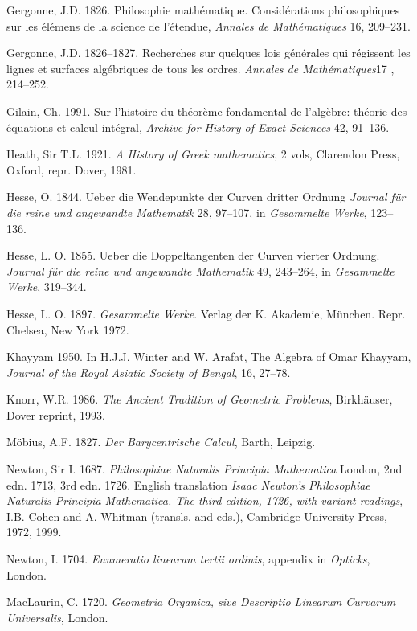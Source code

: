 \documentclass[11pt]{article}
\begin{document}
\noindent Gergonne, J.D. 1826. Philosophie math\'ematique. Consid\'erations philo\-sophiques sur les \'el\'emens de la science de l'\'etendue, \emph{Annales de Math\'ematiques} 16, 209--231.

\noindent Gergonne, J.D. 1826--1827. Recherches sur quelques lois g\'en\'erales qui r\'egissent les lignes et surfaces alg\'ebriques de tous les ordres. \emph{Annales de Math\'ematiques}17 , 214--252. 
 
 \noindent  Gilain, Ch. 1991. Sur l'histoire du th\'eor\`eme  fondamental de l'alg\`ebre: th\'eorie des \'equations et calcul int\'egral, \emph{Archive for History of Exact Sciences} 42, 91--136.
 
 \noindent Heath, Sir T.L. 1921. \emph{A History of Greek mathematics}, 2 vols, Clarendon Press, Oxford, repr. Dover, 1981.
 
 \noindent Hesse, O. 1844. Ueber die Wendepunkte der  Curven dritter Ordnung \emph{Journal f{\"u}r die reine und angewandte Mathematik} 28, 97--107, in \emph{Gesammelte Werke}, 123--136.
 
\noindent  Hesse, L. O. 1855. Ueber die Doppeltangenten der Curven vierter Ordnung. \emph{Journal f{\"u}r die reine und angewandte Mathematik} 49, 243--264, in \emph{Gesammelte Werke}, 319--344.

\noindent Hesse, L. O. 1897. \emph{Gesammelte Werke}. Verlag der K.  Akademie, M\"{u}nchen. Repr. Chelsea, New York 1972.

\noindent Khayy\={a}m 1950. In H.J.J. Winter and W. Arafat, The Algebra of Omar Khayy\={a}m, \emph{Journal of the Royal Asiatic Society of Bengal}, 16, 27--78.
 
 \noindent Knorr, W.R.  1986. \emph{The Ancient Tradition of Geometric Problems}, Birkh\"auser, Dover reprint, 1993.
 
 \noindent M\"obius, A.F. 1827. \emph{Der Barycentrische Calcul}, Barth, Leipzig.

\noindent Newton, Sir I. 1687. \emph{Philosophiae  Naturalis Principia Mathematica} London, 2nd edn. 1713, 3rd edn. 1726. English translation \emph{Isaac Newton's Philosophiae Naturalis Principia Mathematica. The third edition, 1726, with variant readings}, I.B. Cohen and A. Whitman (transls. and eds.), Cambridge University Press, 1972, 1999.

\noindent Newton, I. 1704. \emph{Enumeratio linearum tertii ordinis}, appendix in \emph{Opticks}, London.

\noindent  MacLaurin, C. 1720.  \emph{Geometria Organica, sive Descriptio Linearum Curvarum Universalis}, London. 
\end{document}
